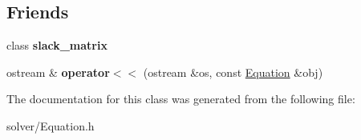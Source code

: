 \subsection*{\-Friends}
\begin{DoxyCompactItemize}
\item 
\hypertarget{classEquation_a719939672fd1aff22cf454d1d3468b00}{class {\bfseries slack\-\_\-matrix}}\label{classEquation_a719939672fd1aff22cf454d1d3468b00}

\item 
\hypertarget{classEquation_a948d3097bdf1b96c0bf30cf8abd5600e}{ostream \& {\bfseries operator$<$$<$} (ostream \&os, const \hyperlink{classEquation}{\-Equation} \&obj)}\label{classEquation_a948d3097bdf1b96c0bf30cf8abd5600e}

\end{DoxyCompactItemize}


\-The documentation for this class was generated from the following file\-:\begin{DoxyCompactItemize}
\item 
solver/\-Equation.\-h\end{DoxyCompactItemize}
